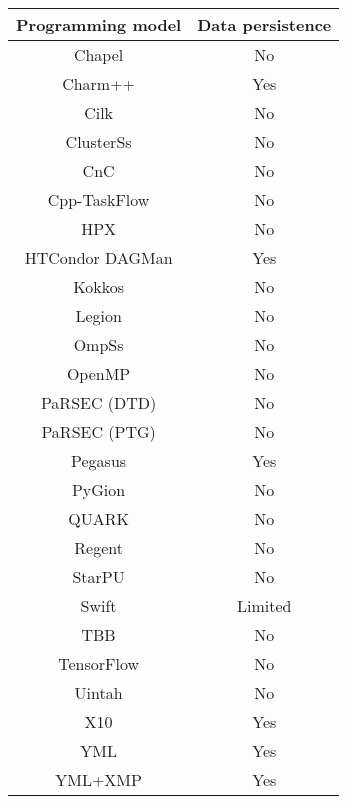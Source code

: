 \begin{tabular}{cc}
\hline
Programming model & Data persistence \\
\hline
Chapel & No\\
Charm++ & Yes\\
Cilk & No\\
ClusterSs & No\\
CnC & No\\
Cpp-TaskFlow & No\\
HPX & No\\
HTCondor DAGMan & Yes\\
Kokkos & No\\
Legion & No\\
OmpSs & No\\
OpenMP & No\\
PaRSEC (DTD) & No\\
PaRSEC (PTG) & No\\
Pegasus & Yes\\
PyGion & No\\
QUARK & No\\
Regent & No\\
StarPU & No\\
Swift & Limited\\
TBB & No\\
TensorFlow & No\\
Uintah & No\\
X10 & Yes\\
YML & Yes\\
YML+XMP & Yes\\
\hline
\end{tabular}

